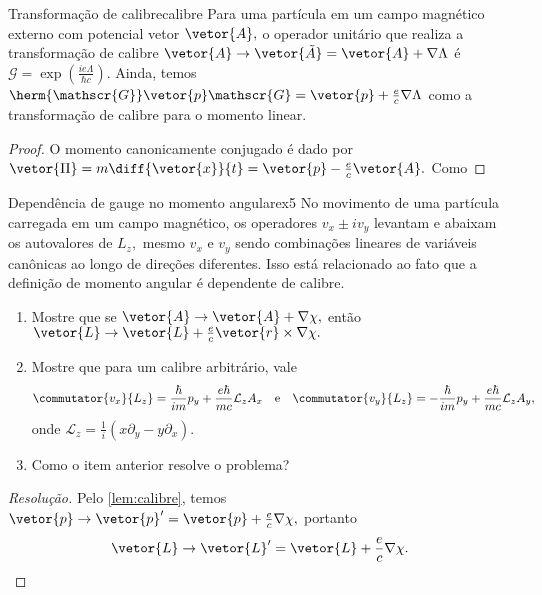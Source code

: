 \begin{lemma}{Transformação de calibre}{calibre}
   Para uma partícula em um campo magnético externo com potencial vetor \(\vetor{A},\) o operador unitário que realiza a transformação de calibre \(\vetor{A} \to \vetor{\tilde{A}} = \vetor{A} + \nabla \Lambda\) é \(\mathscr{G} = \exp\left(\frac{i e \Lambda}{\hbar c}\right)\). Ainda, temos \(\herm{\mathscr{G}} \vetor{p} \mathscr{G} = \vetor{p} + \frac{e}{c} \nabla \Lambda\) como a transformação de calibre para o momento linear.
\end{lemma}
\begin{proof}
   O momento canonicamente conjugado é dado por \(\vetor{\Pi} = m \diff{\vetor{x}}{t} = \vetor{p} - \frac{e}{c} \vetor{A}.\) Como 
\end{proof}
\begin{exercício}{Dependência de gauge no momento angular}{ex5}
   No movimento de uma partícula carregada em um campo magnético, os operadores \(v_x \pm i v_y\) levantam e abaixam os autovalores de \(L_z,\) mesmo \(v_x\) e \(v_y\) sendo combinações lineares de variáveis canônicas ao longo de direções diferentes. Isso está relacionado ao fato que a definição de momento angular é dependente de calibre.
   \begin{enumerate}[label=(\alph*)]
      \item Mostre que se \(\vetor{A} \to \vetor{A} + \nabla\chi,\) então \(\vetor{L} \to \vetor{L} + \frac{e}{c} \vetor{r} \times \nabla\chi.\)
      \item Mostre que para um calibre arbitrário, vale
         \begin{equation*}
            \commutator{v_x}{L_z} = \frac{\hbar}{im} p_y + \frac{e \hbar}{mc} \mathcal{L}_z A_x
            \quad\text{e}\quad
            \commutator{v_y}{L_z} = -\frac{\hbar}{im} p_y + \frac{e \hbar}{mc} \mathcal{L}_z A_y,
         \end{equation*}
         onde \(\mathcal{L}_z = \frac1i \left(x \partial_y - y \partial_x\right).\)
      \item Como o item anterior resolve o problema?
   \end{enumerate}
\end{exercício}
\begin{proof}[Resolução]
   Pelo \cref{lem:calibre}, temos \(\vetor{p} \to \vetor{p}' = \vetor{p} + \frac{e}{c} \nabla \chi,\) portanto
   \begin{equation*}
      \vetor{L} \to \vetor{L}' = \vetor{L} + \frac{e}{c} \nabla \chi.
   \end{equation*}
\end{proof}
